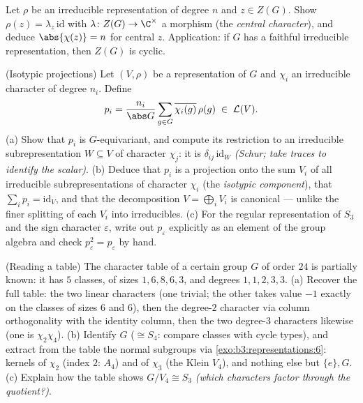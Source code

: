 \begin{exercise}[$\star\star$]\label{exo:b3:representations:10}
Let $\rho$ be an irreducible representation of degree $n$ and $z
\in Z(G)$. Show $\rho(z) = \lambda_z\,\mathrm{id}$ with
$\lambda \colon Z(G) \to \C^\times$ a morphism (the
\emph{central character}), and deduce $\abs{\chi(z)} = n$ for
central $z$. Application: if $G$ has a faithful irreducible
representation, then $Z(G)$ is cyclic.
\end{exercise}

\begin{exercise}[$\star\star$]\label{exo:b3:representations:11}
(Isotypic projections) Let $(V, \rho)$ be a representation of
$G$ and $\chi_i$ an irreducible character of degree $n_i$.
Define
\[
p_i = \frac{n_i}{\abs G}\sum_{g\in G}
\overline{\chi_i(g)}\,\rho(g) \;\in\; \mathcal L(V).
\]
(a) Show that $p_i$ is $G$-equivariant, and compute its
restriction to an irreducible subrepresentation $W \subseteq
V$ of character $\chi_j$: it is $\delta_{ij}\,
\mathrm{id}_W$ \emph{(Schur; take traces to identify the
scalar)}.
(b) Deduce that $p_i$ is a projection onto the sum $V_i$ of
all irreducible subrepresentations of character $\chi_i$ (the
\emph{isotypic component}), that $\sum_ip_i =
\mathrm{id}_V$, and that the decomposition $V =
\bigoplus_iV_i$ is canonical --- unlike the finer splitting
of each $V_i$ into irreducibles.
(c) For the regular representation of $S_3$ and the sign
character $\varepsilon$, write out $p_\varepsilon$ explicitly
as an element of the group algebra and check $p_\varepsilon^2
= p_\varepsilon$ by hand.
\end{exercise}

\begin{exercise}[$\star\star$]\label{exo:b3:representations:12}
(Reading a table) The character table of a certain group $G$
of order $24$ is partially known: it has $5$ classes, of
sizes $1, 6, 8, 6, 3$, and degrees $1, 1, 2, 3, 3$.
(a) Recover the full table: the two linear characters
(one trivial; the other takes value $-1$ exactly on the
classes of sizes $6$ and $6$), then the degree-$2$ character
via column orthogonality with the identity column, then the
two degree-$3$ characters likewise (one is $\chi_2\chi_4$).
(b) Identify $G$ ($\cong S_4$: compare classes with cycle
types), and extract from the table the normal subgroups via
\cref{exo:b3:representations:6}: kernels of $\chi_2$ (index
$2$: $A_4$) and of $\chi_3$ (the Klein $V_4$), and nothing
else but $\{e\}, G$.
(c) Explain how the table shows $G/V_4 \cong S_3$
\emph{(which characters factor through the quotient?)}.
\end{exercise}

